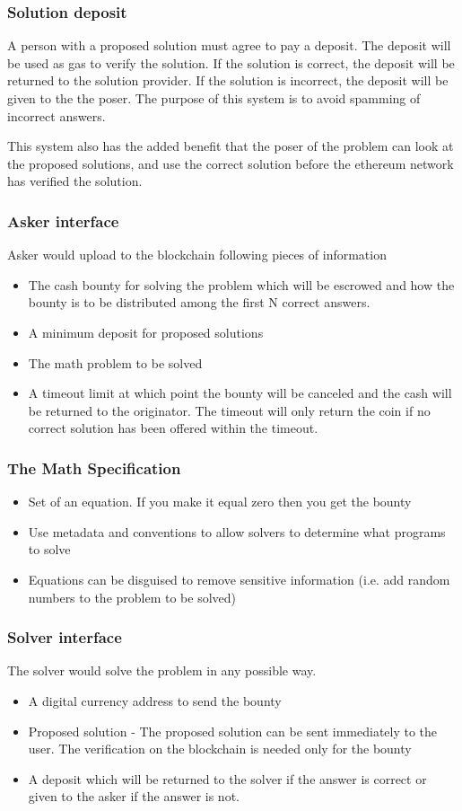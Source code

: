 \documentclass{beamer}
\begin{document}
\begin{frame}
  \frametitle{Solution deposit}
  A person with a proposed solution must agree to pay a deposit.  The
  deposit will be used as gas to verify the solution.  If the solution
  is correct, the deposit will be returned to the solution provider.
  If the solution is incorrect, the deposit will be given to the the
  poser.  The purpose of this system is to avoid spamming of incorrect
  answers.

  This system also has the added benefit that the poser of the problem
  can look at the proposed solutions, and use the correct solution
  before the ethereum network has verified the solution.
\end{frame}  
\begin{frame}
  \frametitle{Asker interface}
  Asker would upload to the blockchain following pieces of information
  \begin{itemize}
  \item The cash bounty for solving the problem which will be
    escrowed and how the bounty is to be distributed among the first
    N correct answers.
  \item A minimum deposit for proposed solutions
  \item The math problem to be solved
  \item A timeout limit at which point the bounty will be canceled
    and the cash will be returned to the originator.  The timeout will
    only return the coin if no correct solution has been offered
    within the timeout.
  \end{itemize}
\end{frame}
\begin{frame}
  \frametitle{The Math Specification}
  \begin{itemize}
    \item Set of an equation.  If you make it equal zero then you get
      the bounty
    \item Use metadata and conventions to allow solvers to determine
      what programs to solve
    \item Equations can be disguised to remove sensitive information
      (i.e. add random numbers to the problem to be solved)
  \end{itemize}
\end{frame}
\begin{frame}
  \frametitle{Solver interface}
The solver would solve the problem in any possible way.
  \begin{itemize}
  \item A digital currency address to send the bounty
  \item Proposed solution - The proposed solution can be sent
    immediately to the user.  The verification on the blockchain is
    needed only for the bounty
  \item A deposit which will be returned to the solver if the answer
    is correct or given to the asker if the answer is not.
  \end{itemize}
\end{frame}
\end{document}
